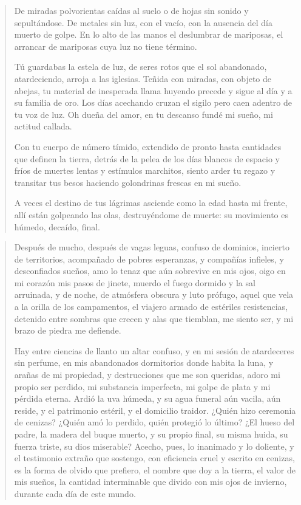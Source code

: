 \documentclass[12pt]{article}
\begin{document}
\clearpage
{}
\begin{verse}
De miradas polvorientas caídas al suelo  
o de hojas sin sonido y sepultándose.  
De metales sin luz, con el vacío,  
con la ausencia del día muerto de golpe.  
En lo alto de las manos el deslumbrar de mariposas,  
el arrancar de mariposas cuya luz no tiene término.  
	
Tú guardabas la estela de luz, de seres rotos  
que el sol abandonado, atardeciendo, arroja a las iglesias.  
Teñida con miradas, con objeto de abejas,  
tu material de inesperada llama huyendo  
precede y sigue al día y a su familia de oro.  
Los días acechando cruzan el sigilo  
pero caen adentro de tu voz de luz.  
Oh dueña del amor, en tu descanso  
fundé mi sueño, mi actitud callada.  
	
Con tu cuerpo de número tímido, extendido de pronto  
hasta cantidades que definen la tierra,  
detrás de la pelea de los días blancos de espacio  
y fríos de muertes lentas y estímulos marchitos,  
siento arder tu regazo y transitar tus besos  
haciendo golondrinas frescas en mi sueño.  
	
A veces el destino de tus lágrimas asciende  
como la edad hasta mi frente, allí  
están golpeando las olas, destruyéndome de muerte:  
su movimiento es húmedo, decaído, final.

\end{verse}

\clearpage
{}
\begin{verse}
Después de mucho, después de vagas leguas,  
confuso de dominios, incierto de territorios,  
acompañado de pobres esperanzas,  
y compañías infieles, y desconfiados sueños,  
amo lo tenaz que aún sobrevive en mis ojos,  
oigo en mi corazón mis pasos de jinete,  
muerdo el fuego dormido y la sal arruinada,  
y de noche, de atmósfera obscura y luto prófugo,  
aquel que vela a la orilla de los campamentos,  
el viajero armado de estériles resistencias,  
detenido entre sombras que crecen y alas que tiemblan,  
me siento ser, y mi brazo de piedra me defiende.  
	
Hay entre ciencias de llanto un altar confuso,  
y en mi sesión de atardeceres sin perfume,  
en mis abandonados dormitorios donde habita la luna,  
y arañas de mi propiedad, y destrucciones que me son queridas,  
adoro mi propio ser perdido, mi substancia imperfecta,  
mi golpe de plata y mi pérdida eterna.  
Ardió la uva húmeda, y su agua funeral  
aún vacila, aún reside,  
y el patrimonio estéril, y el domicilio traidor.  
¿Quién hizo ceremonia de cenizas?  
¿Quién amó lo perdido, quién protegió lo último?  
¿El hueso del padre, la madera del buque muerto,  
y su propio final, su misma huida,  
su fuerza triste, su dios miserable?  
Acecho, pues, lo inanimado y lo doliente,  
y el testimonio extraño que sostengo,  
con eficiencia cruel y escrito en cenizas,  
es la forma de olvido que prefiero,  
el nombre que doy a la tierra, el valor de mis sueños,  
la cantidad interminable que divido  
con mis ojos de invierno, durante cada día de este mundo.

\end{verse}
\end{document}
